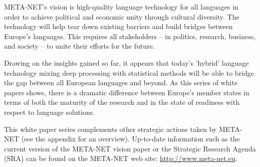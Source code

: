 \begin{multicols}{2}

META-NET’s vision is high-quality language technology for all languages in order to achieve political and economic unity through cultural diversity. The technology will help tear down existing barriers and build bridges between Europe’s languages. This requires all stakeholders -- in politics, research, business, and society -- to unite their efforts for the future.

Drawing on the insights gained so far, it appears that today’s 'hybrid' language technology mixing deep processing with statistical methods will be able to bridge the gap between all European languages and beyond. As this series of white papers shows, there is a dramatic difference between Europe’s member states in terms of both the maturity of the research and in the state of readiness with respect to language solutions.

This white paper series complements other strategic actions taken by META-NET (see the appendix for an overview). Up-to-date information such as the current version of the META-NET vision paper \cite{Vision} or the Strategic Research Agenda (SRA) can be found on the META-NET web site: \url{http://www.meta-net.eu}.
\end{multicols}

\clearpage


